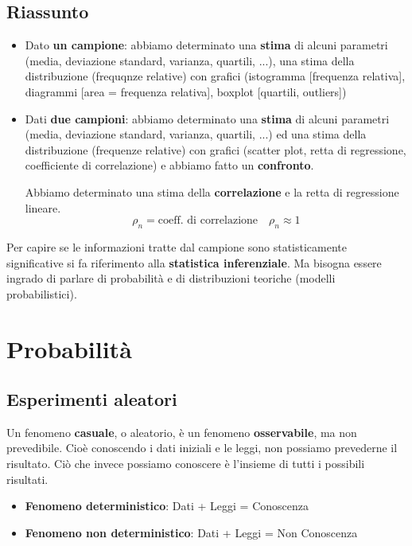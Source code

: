 \documentclass[a4paper]{article}
\theoremstyle{break}
\theoremstyle{break}
\theoremstyle{break}
\theoremstyle{break}
\begin{document}
\subsection{Riassunto}
\begin{itemize}
  \item Dato \textbf{un campione}: abbiamo determinato una \textbf{stima} di alcuni
    parametri (media, deviazione standard, varianza, quartili, ...), una stima della
    distribuzione (frequqnze relative) con grafici (istogramma [frequenza relativa],
    diagrammi [area = frequenza relativa], boxplot [quartili, outliers])
  \item Dati \textbf{due campioni}: abbiamo determinato una \textbf{stima} di alcuni
    parametri (media, deviazione standard, varianza, quartili, ...) ed una stima della
    distribuzione (frequenze relative) con grafici (scatter plot, retta di regressione,
    coefficiente di correlazione) e abbiamo fatto un \textbf{confronto}.

    Abbiamo determinato una stima della \textbf{correlazione} e la retta di regressione lineare.
    \[
      \rho_n = \text{coeff. di correlazione} \quad \rho_n \approx 1
    \] 
\end{itemize}

\noindent Per capire se le informazioni tratte dal campione sono statisticamente significative
si fa riferimento alla \textbf{statistica inferenziale}. Ma bisogna essere ingrado di
parlare di probabilità e di distribuzioni teoriche (modelli probabilistici).

\section{Probabilità}
\subsection{Esperimenti aleatori}
Un fenomeno \textbf{casuale}, o aleatorio, è un fenomeno \textbf{osservabile}, ma non
prevedibile. Cioè conoscendo i dati iniziali e le leggi, non possiamo prevederne il 
risultato. Ciò che invece possiamo conoscere è l'insieme di tutti i possibili risultati.
\begin{itemize}
  \item \textbf{Fenomeno deterministico}: Dati + Leggi = Conoscenza
  \item \textbf{Fenomeno non deterministico}: Dati + Leggi = Non Conoscenza
\end{itemize}
\end{document}
